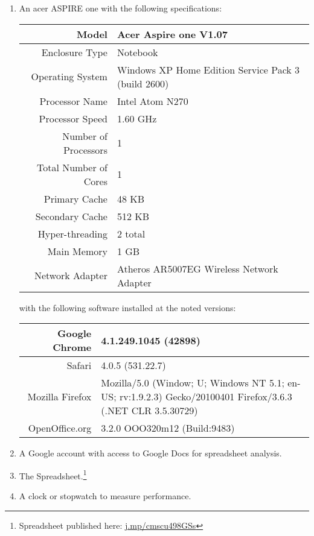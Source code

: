 \documentclass[12pt,oneside,letterpaper,titlepage]{article}
\begin{document}
\begin{enumerate}
\item An acer ASPIRE one with the following specifications:

  \begin{table}[htbp]
    \begin{tabular}{| r | p{5cm} |}
      \hline
      Model                        & Acer Aspire one V1.07 \\ \hline
      Enclosure Type               & Notebook \\ \hline
      Operating System             & Windows XP Home Edition Service Pack 3 (build
                                     2600) \\ \hline
      Processor Name               & Intel Atom N270 \\ \hline
      Processor Speed              & 1.60 GHz \\ \hline
      Number of Processors         & 1 \\ \hline
      Total Number of Cores        & 1 \\ \hline
      Primary Cache                & 48 KB \\ \hline
      Secondary Cache              & 512 KB \\ \hline
      Hyper-threading              & 2 total \\ \hline
      Main Memory                  & 1 GB \\ \hline
      Network Adapter              & Atheros AR5007EG Wireless Network Adapter \\
      \hline
    \end{tabular}
  \end{table}

  with the following software installed at the noted versions:

  \begin{tabular}{| r | p{5cm} |}
    \hline
    Google Chrome                & 4.1.249.1045 (42898) \\ \hline
    Safari                       & 4.0.5 (531.22.7) \\ \hline
    Mozilla Firefox              & Mozilla/5.0 (Window; U; Windows NT 5.1;
                                   en-US; rv:1.9.2.3) Gecko/20100401
                                   Firefox/3.6.3 (.NET CLR 3.5.30729) \\ \hline
    OpenOffice.org               & 3.2.0 OOO320m12 (Build:9483) \\
    \hline
  \end{tabular}


\item A Google account with access to Google Docs for spreadsheet analysis.

\item The Spreadsheet.\footnote{Spreadsheet published here:
  \url{j.mp/cmscu498GSs}}

\item A clock or stopwatch to measure performance.

\end{enumerate}
\end{document}
